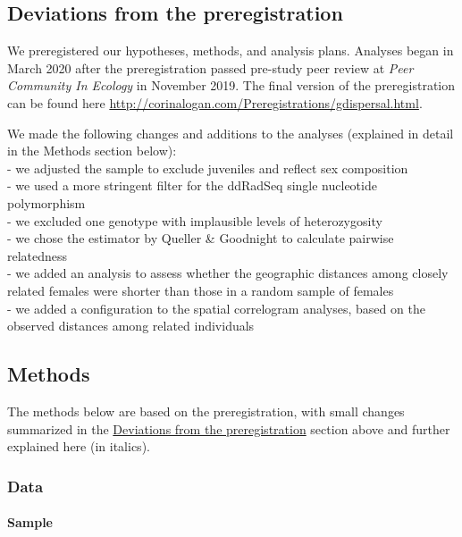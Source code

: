 \documentclass[]{article}
\let\oldparagraph\paragraph
\renewcommand{\paragraph}[1]{\oldparagraph{#1}\mbox{}}
\begin{document}
\hypertarget{deviations-from-the-preregistration}{%
\subsection{Deviations from the
preregistration}\label{deviations-from-the-preregistration}}

We preregistered our hypotheses, methods, and analysis plans. Analyses
began in March 2020 after the preregistration passed pre-study peer
review at \emph{Peer Community In Ecology} in November 2019. The final
version of the preregistration can be found here
\url{http://corinalogan.com/Preregistrations/gdispersal.html}.

We made the following changes and additions to the analyses (explained
in detail in the Methods section below):\\
- we adjusted the sample to exclude juveniles and reflect sex
composition\\
- we used a more stringent filter for the ddRadSeq single nucleotide
polymorphism\\
- we excluded one genotype with implausible levels of heterozygosity\\
- we chose the estimator by Queller \& Goodnight to calculate pairwise
relatedness\\
- we added an analysis to assess whether the geographic distances among
closely related females were shorter than those in a random sample of
females\\
- we added a configuration to the spatial correlogram analyses, based on
the observed distances among related individuals

\newpage

\hypertarget{methods}{%
\subsection{Methods}\label{methods}}

The methods below are based on the preregistration, with small changes
summarized in the
\protect\hyperlink{deviations-from-the-preregistration}{Deviations from
the preregistration} section above and further explained here (in
italics).

\hypertarget{data}{%
\subsubsection{Data}\label{data}}

\hypertarget{sample}{%
\paragraph{Sample}\label{sample}}
\end{document}
